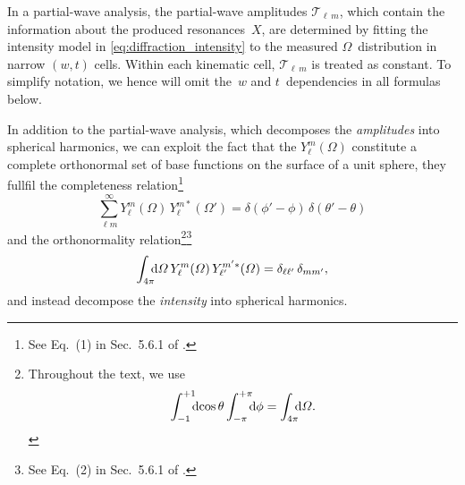 In a partial-wave analysis, the partial-wave amplitudes
$\mathcal{T}_{\ell\, m}$, which contain the information about the
produced resonances~$X$, are determined by fitting the intensity model
in \cref{eq:diffraction_intensity} to the measured
$\Omega$~distribution in narrow $(w, t)$ cells.  Within each kinematic
cell, $\mathcal{T}_{\ell\, m}$ is treated as constant.  To simplify
notation, we hence will omit the~$w$ and $t$~dependencies in all
formulas below.

In addition to the partial-wave analysis, which decomposes the
\emph{amplitudes} into spherical harmonics, we can exploit the fact
that the $Y_\ell^m(\Omega)$ constitute a complete orthonormal set of
base functions on the surface of a unit sphere, \ie they fullfil the
completeness relation\footnote{See Eq.~(1) in Sec.~5.6.1 of
.}
\begin{equation}
  \label{eq:spherical_harm_complete}
  \sum_{\ell m}^\infty Y_\ell^m(\Omega)\, Y_\ell^{m *}(\Omega')
  = \delta(\phi' - \phi)\, \delta(\theta' - \theta)
\end{equation}
and the orthonormality relation\footnote{%
Throughout the text, we use
\begin{equation}
  \int_{-1}^{+1}\!\!\! \dif{\cos\theta} \int_{-\pi}^{+\pi}\!\!\! \dif{\phi}
  = \int_{4 \pi}\!\!\! \dif{\Omega}.
\end{equation}
}\footnote{See Eq.~(2) in Sec.~5.6.1 of
.}
\begin{equation}
  \label{eq:spherical_harm_orthonorm}
  \int_{4 \pi}\!\!\! \dif{\Omega}\, Y_\ell^m(\Omega)\, Y_{\ell'}^{m' *}(\Omega)
  = \delta_{\ell \ell'}\, \delta_{m m'},
\end{equation}
and instead decompose the \emph{intensity} into spherical harmonics.

